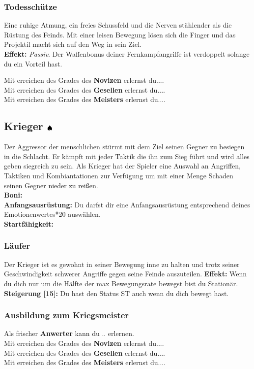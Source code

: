 \subsubsection*{Todesschütze} \label{sk:todesschütze}
Eine ruhige Atmung, ein freies Schussfeld und die Nerven stählender als die Rüstung des Feinds. Mit einer leisen Bewegung lösen sich die Finger und das Projektil macht sich auf den Weg in sein Ziel.\\
\textbf{Effekt:} \textit{Passiv}. Der Waffenbonus deiner Fernkampfangriffe ist verdoppelt solange du ein Vorteil hast.


Mit erreichen des Grades des \textbf{Novizen} erlernst du....\\
Mit erreichen des Grades des \textbf{Gesellen} erlernst du....\\
Mit erreichen des Grades des \textbf{Meisters} erlernst du....\\


\subsection*{Krieger ${\color{blue} }{\color{black}\spadesuit}$}
Der Aggressor der menschlichen stürmt mit dem Ziel seinen Gegner zu besiegen in die Schlacht. Er kämpft mit jeder Taktik die ihn zum Sieg führt und wird alles geben siegreich zu sein. Als Krieger hat der Spieler eine Auswahl an Angriffen, Taktiken und Kombiantationen zur Verfügung um mit einer Menge Schaden seinen Gegner nieder zu reißen. \\
\textbf{Boni:} \\
\textbf{Anfangsausrüstung:} Du darfst dir eine Anfangsausrüstung entsprechend deines Emotionenwertes*20 auswählen.\\
\textbf{Startfähigkeit:}  \\

\subsubsection*{Läufer} \label{sk:laeufer}
Der Krieger ist es gewohnt in seiner Bewegung inne zu halten und trotz seiner Geschwindigkeit schwerer Angriffe gegen seine Feinde auszuteilen.
\textbf{Effekt:} Wenn du dich nur um die Hälfte der max Bewegungsrate bewegst bist du Stationär.\\
\textbf{Steigerung [15]:}  Du hast den Status ST auch wenn du dich bewegt hast.

\subsubsection*{Ausbildung zum Kriegsmeister}
Als frischer \textbf{Anwerter} kann du .. erlernen.\\
Mit erreichen des Grades des \textbf{Novizen} erlernst du....\\
Mit erreichen des Grades des \textbf{Gesellen} erlernst du....\\
Mit erreichen des Grades des \textbf{Meisters} erlernst du....\\


